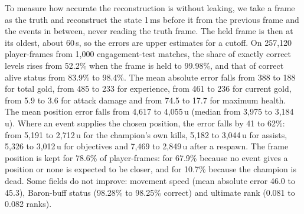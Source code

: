 To measure how accurate the reconstruction is without leaking, we take a frame as the truth and
reconstruct the state 1\,ms before it from the previous frame and the events in between, never reading the
truth frame. The held frame is then at its oldest, about 60\,s, so the errors are upper estimates for a
cutoff. On 257,120 player-frames from 1,000 engagement-test matches, the share of exactly correct levels
rises from 52.2\% when the frame is held to 99.98\%, and that of correct alive status from 83.9\% to
98.4\%. The mean absolute error falls from 388 to 188 for total gold, from 485 to 233 for experience,
from 461 to 236 for current gold, from 5.9 to 3.6 for attack damage and from 74.5 to 17.7 for maximum
health. The mean position error falls from 4,617 to 4,055\,u (median from 3,975 to 3,184\,u). Where an
event supplies the chosen position, the error falls by 41 to 62\%: from 5,191 to 2,712\,u for the
champion's own kills, 5,182 to 3,044\,u for assists, 5,326 to 3,012\,u for objectives and 7,469 to
2,849\,u after a respawn. The frame position is kept for 78.6\% of player-frames: for 67.9\% because no
event gives a position or none is expected to be closer, and for 10.7\% because the champion is dead.
Some fields do not improve: movement speed (mean absolute error 46.0 to
45.3), Baron-buff status (98.28\% to 98.25\% correct) and ultimate rank (0.081 to 0.082 ranks).


